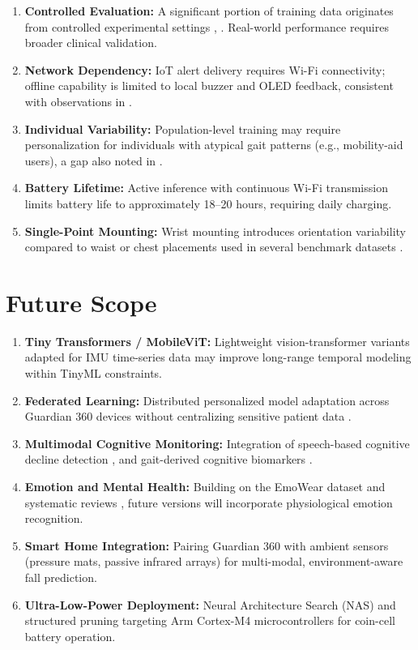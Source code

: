\documentclass[conference]{IEEEtran}
\begin{document}
\begin{enumerate}
    \item \textbf{Controlled Evaluation:} A significant portion of training data originates from controlled experimental settings \cite{b30}, \cite{b31}. Real-world performance requires broader clinical validation.
    \item \textbf{Network Dependency:} IoT alert delivery requires Wi-Fi connectivity; offline capability is limited to local buzzer and OLED feedback, consistent with observations in \cite{b35}.
    \item \textbf{Individual Variability:} Population-level training may require personalization for individuals with atypical gait patterns (e.g., mobility-aid users), a gap also noted in \cite{b22}.
    \item \textbf{Battery Lifetime:} Active inference with continuous Wi-Fi transmission limits battery life to approximately 18--20 hours, requiring daily charging.
    \item \textbf{Single-Point Mounting:} Wrist mounting introduces orientation variability compared to waist or chest placements used in several benchmark datasets \cite{b30}.
\end{enumerate}

\section{Future Scope}

\begin{enumerate}
    \item \textbf{Tiny Transformers / MobileViT:} Lightweight vision-transformer variants adapted for IMU time-series data may improve long-range temporal modeling within TinyML constraints.
    \item \textbf{Federated Learning:} Distributed personalized model adaptation across Guardian 360 devices without centralizing sensitive patient data \cite{b22}.
    \item \textbf{Multimodal Cognitive Monitoring:} Integration of speech-based cognitive decline detection \cite{b26}, \cite{b27} and gait-derived cognitive biomarkers \cite{b18}.
    \item \textbf{Emotion and Mental Health:} Building on the EmoWear dataset \cite{b12} and systematic reviews \cite{b28}, future versions will incorporate physiological emotion recognition.
    \item \textbf{Smart Home Integration:} Pairing Guardian 360 with ambient sensors (pressure mats, passive infrared arrays) for multi-modal, environment-aware fall prediction.
    \item \textbf{Ultra-Low-Power Deployment:} Neural Architecture Search (NAS) and structured pruning targeting Arm Cortex-M4 microcontrollers for coin-cell battery operation.
\end{enumerate}
\end{document}
